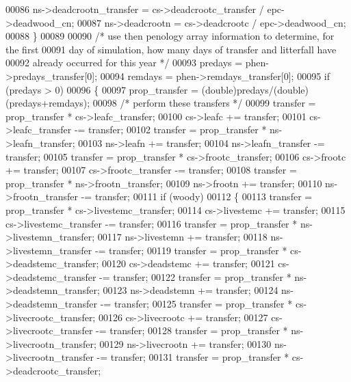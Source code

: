 \begin{DoxyCode}
00086         ns->deadcrootn\_transfer = cs->deadcrootc\_transfer / epc->deadwood\_cn;
00087         ns->deadcrootn = cs->deadcrootc / epc->deadwood\_cn;
00088     \}
00089     
00090     \textcolor{comment}{/* use then penology array information to determine, for the first}
00091 \textcolor{comment}{    day of simulation, how many days of transfer and litterfall have}
00092 \textcolor{comment}{    already occurred for this year */}
00093     predays = phen->predays\_transfer[0];
00094     remdays = phen->remdays\_transfer[0];
00095     \textcolor{keywordflow}{if} (predays > 0)
00096     \{
00097         prop\_transfer = (double)predays/(\textcolor{keywordtype}{double})(predays+remdays);
00098         \textcolor{comment}{/* perform these transfers */}
00099         transfer = prop\_transfer * cs->leafc\_transfer;
00100         cs->leafc          += transfer;
00101         cs->leafc\_transfer -= transfer;
00102         transfer = prop\_transfer * ns->leafn\_transfer;
00103         ns->leafn          += transfer;
00104         ns->leafn\_transfer -= transfer;
00105         transfer = prop\_transfer * cs->frootc\_transfer;
00106         cs->frootc          += transfer;
00107         cs->frootc\_transfer -= transfer;
00108         transfer = prop\_transfer * ns->frootn\_transfer;
00109         ns->frootn          += transfer;
00110         ns->frootn\_transfer -= transfer;
00111         \textcolor{keywordflow}{if} (woody)
00112         \{
00113             transfer = prop\_transfer * cs->livestemc\_transfer;
00114             cs->livestemc          += transfer;
00115             cs->livestemc\_transfer -= transfer;
00116             transfer = prop\_transfer * ns->livestemn\_transfer;
00117             ns->livestemn          += transfer;
00118             ns->livestemn\_transfer -= transfer;
00119             transfer = prop\_transfer * cs->deadstemc\_transfer;
00120             cs->deadstemc          += transfer;
00121             cs->deadstemc\_transfer -= transfer;
00122             transfer = prop\_transfer * ns->deadstemn\_transfer;
00123             ns->deadstemn          += transfer;
00124             ns->deadstemn\_transfer -= transfer;
00125             transfer = prop\_transfer * cs->livecrootc\_transfer;
00126             cs->livecrootc          += transfer;
00127             cs->livecrootc\_transfer -= transfer;
00128             transfer = prop\_transfer * ns->livecrootn\_transfer;
00129             ns->livecrootn          += transfer;
00130             ns->livecrootn\_transfer -= transfer;
00131             transfer = prop\_transfer * cs->deadcrootc\_transfer;

\end{DoxyCode}
